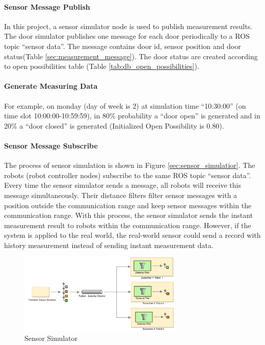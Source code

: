 \paragraph{Sensor Message Publish}
In this project, a sensor simulator node is used to publish measurement results. The door simulator publishes one message for each door periodically to a ROS topic ``sensor data''. The message contains door id, sensor position and door status(Table \ref{sec:measurement_message}). The door status are created according to open possibilities table (Table \ref{tab:db_open_possibilities}). 


\paragraph{Generate Measuring Data}
For example, on monday (day of week is 2) at simulation time ``10:30:00'' (on time slot 10:00:00-10:59:59), in 80\% probability a ``door open'' is generated and in 20\% a ``door closed'' is generated (Initialized Open Possibility is 0.80).


\paragraph{Sensor Message Subscribe}
The process of sensor simulation is shown in Figure \ref{sec:sensor_simulatior}. The robots (robot controller nodes) subscribe to the same ROS topic ``sensor data''. Every time the sensor simulator sends a message, all robots will receive this message simultaneously. Their distance filters filter sensor messages with a position outside the communication range and keep sensor messages within the communication range. With this process, the sensor simulator sends the instant measurement result to robots within the communication range. However, if the system is applied to the real world, the real-world sensor could send a record with history measurement instead of sending instant measurement data.

\begin{figure}
\centering
\includegraphics[width = 0.7\textwidth]{content/images/ch4/sensor_simulator.drawio.png}
\caption{Sensor Simulator}
\label{fig:sensor_simulator}
\end{figure}

